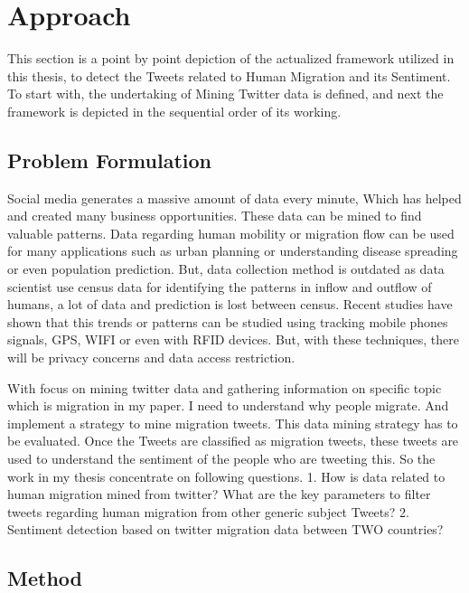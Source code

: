 \chapter{Approach}\label{chap:approach}
This section is a point by point depiction of the actualized framework utilized in this thesis, to detect the Tweets related to Human Migration  and its Sentiment. To start with, the undertaking of Mining Twitter data is defined, and next the framework is depicted in the sequential order of its working.

\section{Problem Formulation}

Social media generates a massive amount of data every minute, Which has helped and created 
many business opportunities. These data can be mined to find valuable patterns. Data regarding human mobility or migration flow can be used for many applications such as urban planning 
or understanding disease spreading or even population prediction. But, data collection method
 is outdated as data scientist use census data for identifying the patterns in inflow and outflow 
of humans, a lot of data and prediction is lost between census. Recent studies have shown that
this trends or patterns can be studied using tracking mobile phones signals, GPS, WIFI or even
with RFID devices. But, with these techniques, there will be privacy concerns and data access 
restriction. 

With focus on mining twitter data and gathering information on specific topic which is migration in
my paper. I need to understand why people migrate. And implement a strategy to mine migration
tweets. This data mining strategy has to be evaluated. Once the Tweets are classified as migration
tweets, these tweets are used to understand the sentiment of the people who are tweeting this. So
the work in my thesis concentrate on following questions.
1. How is data related to human migration mined from twitter? What are the key
parameters to filter tweets regarding human migration from other generic subject Tweets?
2. Sentiment detection based on twitter migration data between TWO countries?


\section{Method}